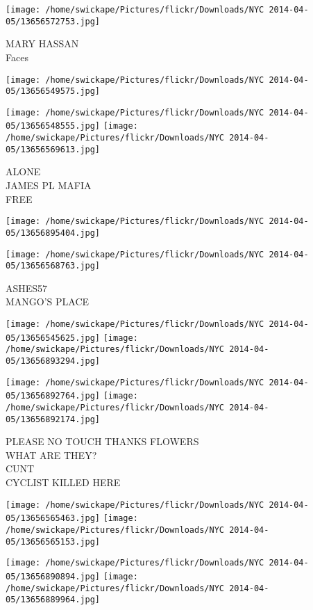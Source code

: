 \documentclass[10pt,letterpaper]{article}
\begin{document}
\vspace{0.25in}
\texttt{[image: /home/swickape/Pictures/flickr/Downloads/NYC 2014-04-05/13656572753.jpg]}

MARY HASSAN\\
Faces\\
\pagebreak

\texttt{[image: /home/swickape/Pictures/flickr/Downloads/NYC 2014-04-05/13656549575.jpg]}

\vspace{0.25in}
\texttt{[image: /home/swickape/Pictures/flickr/Downloads/NYC 2014-04-05/13656548555.jpg]}
\texttt{[image: /home/swickape/Pictures/flickr/Downloads/NYC 2014-04-05/13656569613.jpg]}

ALONE\\
JAMES PL MAFIA\\
FREE\\
\pagebreak

\texttt{[image: /home/swickape/Pictures/flickr/Downloads/NYC 2014-04-05/13656895404.jpg]}

\vspace{0.25in}
\texttt{[image: /home/swickape/Pictures/flickr/Downloads/NYC 2014-04-05/13656568763.jpg]}

ASHES57\\
MANGO'S PLACE\\
\pagebreak

\texttt{[image: /home/swickape/Pictures/flickr/Downloads/NYC 2014-04-05/13656545625.jpg]}
\texttt{[image: /home/swickape/Pictures/flickr/Downloads/NYC 2014-04-05/13656893294.jpg]}

\texttt{[image: /home/swickape/Pictures/flickr/Downloads/NYC 2014-04-05/13656892764.jpg]}
\texttt{[image: /home/swickape/Pictures/flickr/Downloads/NYC 2014-04-05/13656892174.jpg]}

PLEASE NO TOUCH THANKS FLOWERS\\
WHAT ARE THEY?\\
CUNT\\
CYCLIST KILLED HERE\\
\pagebreak

\texttt{[image: /home/swickape/Pictures/flickr/Downloads/NYC 2014-04-05/13656565463.jpg]}
\texttt{[image: /home/swickape/Pictures/flickr/Downloads/NYC 2014-04-05/13656565153.jpg]}

\texttt{[image: /home/swickape/Pictures/flickr/Downloads/NYC 2014-04-05/13656890894.jpg]}
\texttt{[image: /home/swickape/Pictures/flickr/Downloads/NYC 2014-04-05/13656889964.jpg]}
\end{document}
